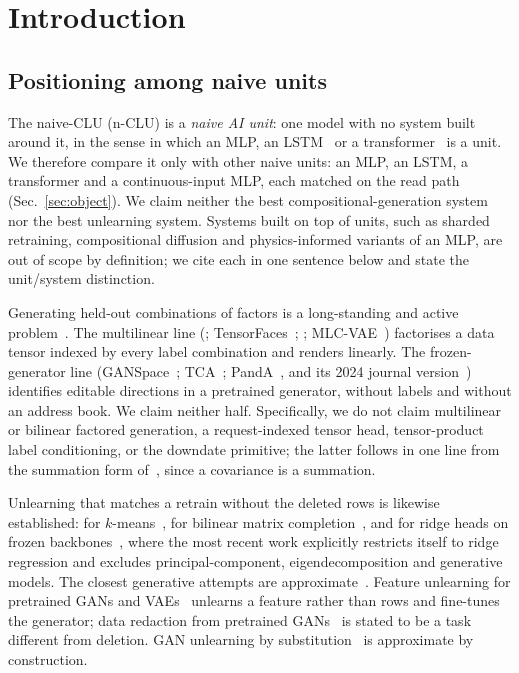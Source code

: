 \documentclass{article} %
\begin{document}
\section{Introduction}
\label{sec:intro}

\subsection{Positioning among naive units}
\label{sec:positioning}

The naive-CLU (n-CLU) is a \emph{naive AI unit}: one model with no system built around it, in the sense
in which an MLP, an LSTM~\citep{hochreiter_long_1997} or a transformer~\citep{vaswani_attention_2023} is a unit. We therefore compare it only with other naive
units: an MLP, an LSTM, a transformer and a continuous-input MLP, each matched on the read path
(Sec.~\ref{sec:object}). We claim neither the best compositional-generation system nor the best
unlearning system. Systems built on top of units, such as sharded retraining, compositional
diffusion and physics-informed variants of an MLP, are out of scope by definition; we cite each
in one sentence below and state the unit/system distinction.

Generating held-out combinations of factors is a long-standing and active problem~\citep{du_compositional_2020,avidan_compositional_2022}. The multilinear line (\citealp{tenenbaum_separating_2000};
TensorFaces~\citep{goos_multilinear_2002}; \citealp{vlasic_face_2005}; MLC-VAE~\citep{georgopoulos_multilinear_2020}) factorises a data tensor
indexed by every label combination and renders linearly. The frozen-generator line
(GANSpace~\citep{harkonen_ganspace_2020}; TCA~\citep{oldfield_tensor_2021}; PandA~\citep{oldfield_panda_2023}, and its 2024 journal version~\citep{oldfield_bilinear_2024}) identifies editable directions in a
pretrained generator, without labels and without an address book. We claim neither half.
Specifically, we do not claim multilinear or bilinear factored generation, a request-indexed
tensor head, tensor-product label conditioning, or the downdate primitive; the latter follows
in one line from the summation form of~\citet{cao_towards_2015}, since a covariance is a summation.

Unlearning that matches a retrain without the deleted rows is likewise established: for $k$-means~\citep{ginart_making_2019}, for bilinear
matrix completion~\citep{xu_netflix_2023}, and for ridge heads on frozen backbones~\citep{ceci_exact_2027}, where the most recent work
explicitly restricts itself to ridge regression and excludes principal-component,
eigendecomposition and generative models. The closest generative attempts are approximate~\citep{kong_approximate_2022}.
Feature unlearning for pretrained GANs and VAEs~\citep{moon_feature_2024} unlearns a feature rather than rows and
fine-tunes the generator; data redaction from pretrained GANs~\citep{kong_data_2023} is stated to be a task different
from deletion. GAN unlearning by substitution~\citep{sun_generative_2025} is approximate by construction.
\end{document}
